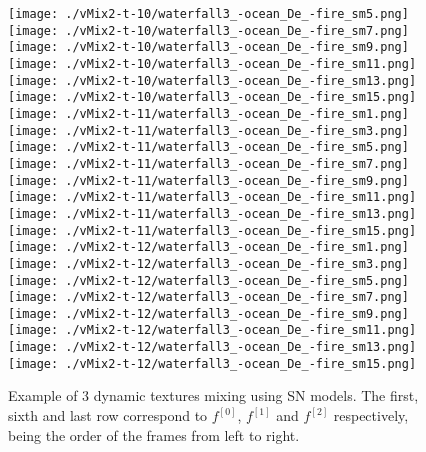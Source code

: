 \begin{figure}[ht!]
{    \texttt{[image: ./vMix2-t-10/waterfall3\_-ocean\_De\_-fire\_sm5.png]}
    \texttt{[image: ./vMix2-t-10/waterfall3\_-ocean\_De\_-fire\_sm7.png]}
    \texttt{[image: ./vMix2-t-10/waterfall3\_-ocean\_De\_-fire\_sm9.png]}
    \texttt{[image: ./vMix2-t-10/waterfall3\_-ocean\_De\_-fire\_sm11.png]}
    \texttt{[image: ./vMix2-t-10/waterfall3\_-ocean\_De\_-fire\_sm13.png]}
    \texttt{[image: ./vMix2-t-10/waterfall3\_-ocean\_De\_-fire\_sm15.png]} \\
\vspace{1mm}
    \texttt{[image: ./vMix2-t-11/waterfall3\_-ocean\_De\_-fire\_sm1.png]}
    \texttt{[image: ./vMix2-t-11/waterfall3\_-ocean\_De\_-fire\_sm3.png]}
    \texttt{[image: ./vMix2-t-11/waterfall3\_-ocean\_De\_-fire\_sm5.png]}
    \texttt{[image: ./vMix2-t-11/waterfall3\_-ocean\_De\_-fire\_sm7.png]}
    \texttt{[image: ./vMix2-t-11/waterfall3\_-ocean\_De\_-fire\_sm9.png]}
    \texttt{[image: ./vMix2-t-11/waterfall3\_-ocean\_De\_-fire\_sm11.png]}
    \texttt{[image: ./vMix2-t-11/waterfall3\_-ocean\_De\_-fire\_sm13.png]}
    \texttt{[image: ./vMix2-t-11/waterfall3\_-ocean\_De\_-fire\_sm15.png]} \\
\vspace{1mm}
    \texttt{[image: ./vMix2-t-12/waterfall3\_-ocean\_De\_-fire\_sm1.png]}
    \texttt{[image: ./vMix2-t-12/waterfall3\_-ocean\_De\_-fire\_sm3.png]}
    \texttt{[image: ./vMix2-t-12/waterfall3\_-ocean\_De\_-fire\_sm5.png]}
    \texttt{[image: ./vMix2-t-12/waterfall3\_-ocean\_De\_-fire\_sm7.png]}
    \texttt{[image: ./vMix2-t-12/waterfall3\_-ocean\_De\_-fire\_sm9.png]}
    \texttt{[image: ./vMix2-t-12/waterfall3\_-ocean\_De\_-fire\_sm11.png]}
    \texttt{[image: ./vMix2-t-12/waterfall3\_-ocean\_De\_-fire\_sm13.png]}
    \texttt{[image: ./vMix2-t-12/waterfall3\_-ocean\_De\_-fire\_sm15.png]} \\
    }
    \caption{
        Example of $3$ dynamic textures mixing using SN models. The first, sixth and last row correspond to $f^{[0]}$, $f^{[1]}$ and $f^{[2]}$ respectively, being the order of the frames from left to right.
    }
\label{fig:dynamic-barycenter-sn}
\end{figure}



